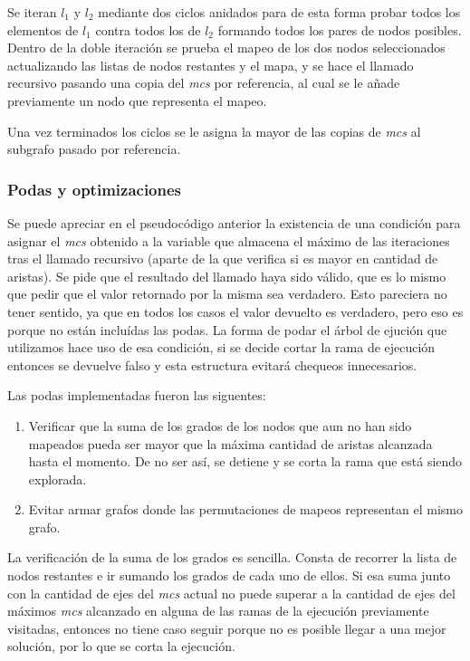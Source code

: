 Se iteran $l_1$ y $l_2$
mediante dos ciclos anidados para de esta forma probar todos los elementos de
$l_1$ contra todos los de $l_2$ formando todos los pares de nodos posibles.
Dentro de la doble iteración se prueba el mapeo de los dos nodos seleccionados
actualizando las listas de nodos restantes y el mapa, y se hace el llamado
recursivo pasando una copia del \textit{mcs} por referencia, al cual se le
añade previamente un nodo que representa el mapeo.

Una vez terminados los ciclos se le asigna la mayor de las copias de
\textit{mcs} al subgrafo pasado por referencia.

\subsubsection{Podas y optimizaciones}

Se puede apreciar en el pseudocódigo anterior la existencia de una condición
para asignar el \textit{mcs} obtenido a la variable que almacena el máximo de
las iteraciones tras el llamado recursivo (aparte de la que verifica si es
mayor en cantidad de aristas). Se pide que el resultado del llamado haya sido
válido, que es lo mismo que pedir que el valor retornado por la misma sea
verdadero. Esto pareciera no tener sentido, ya que en todos los casos el valor
devuelto es verdadero, pero eso es porque no están incluídas las podas. La
forma de podar el árbol de ejución que utilizamos hace uso de esa condición,
si se decide cortar la rama de ejecución entonces se devuelve falso y esta
estructura evitará chequeos innecesarios.

Las podas implementadas fueron las siguentes:

\begin{enumerate}
\item Verificar que la suma de los grados de los nodos que aun no han sido
mapeados pueda ser mayor que la máxima cantidad de aristas alcanzada hasta
el momento. De no ser así, se detiene y se corta la rama que está siendo
explorada.
\item Evitar armar grafos donde las permutaciones de mapeos representan el
mismo grafo.
\end{enumerate}

La verificación de la suma de los grados es sencilla. Consta de recorrer la
lista de nodos restantes e ir sumando los grados de cada uno de ellos. Si esa
suma junto con la cantidad de ejes del \textit{mcs} actual no puede superar
a la cantidad de ejes del máximos \textit{mcs} alcanzado en alguna de las
ramas de la ejecución previamente visitadas, entonces no tiene caso seguir
porque no es posible llegar a una mejor solución, por lo que se corta la
ejecución.

